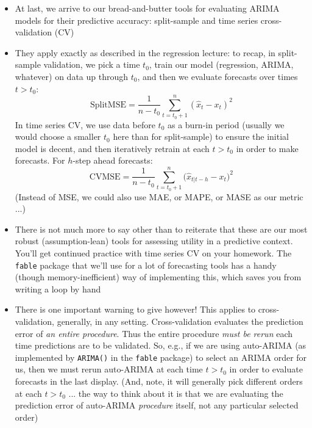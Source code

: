 \documentclass{article}
\begin{document}
\def\SplitMSE{\mathrm{SplitMSE}} 
\def\CVMSE{\mathrm{CVMSE}}

\begin{itemize}
\item At last, we arrive to our bread-and-butter tools for evaluating ARIMA  
  models for their predictive accuracy: split-sample and time series
  cross-validation (CV) 

\item They apply exactly as described in the regression lecture: to recap, in
  split-sample validation, we pick a time $t_0$, train our model (regression,
  ARIMA, whatever) on data up through $t_0$, and then we evaluate forecasts  
   over times $t > t_0$:
  \[
  \SplitMSE = \frac{1}{n-t_0} \sum_{t = t_0+1}^n (\hat{x}_t - x_t)^2    
  \]
  In time series CV, we use data before $t_0$ as a burn-in period (usually we
  would choose a smaller $t_0$ here than for split-sample) to ensure the initial
  model is decent, and then iteratively retrain at each $t > t_0$ in order to
  make forecasts. For $h$-step ahead forecasts:    
  \[
  \CVMSE = \frac{1}{n-t_0} \sum_{t = t_0+1}^n \big( \hat{x}_{t | t-h} - x_t
  \big)^2    
  \]
  (Instead of MSE, we could also use MAE, or MAPE, or MASE as our metric ...) 

\item There is not much more to say other than to reiterate that these are our
  most robust (assumption-lean) tools for assessing utility in a predictive 
  context. You'll get continued practice with time series CV on your
  homework. The \verb|fable| package that we'll use for a lot of forecasting
  tools has a handy (though memory-inefficient) way of implementing this, which
  saves you from writing a loop by hand 

\item There is one important warning to give however! This applies to
  cross-validation, generally, in any setting. Cross-validation evaluates the
  prediction error of \emph{an entire procedure}. Thus the entire procedure
  \emph{must be rerun} each time predictions are to be validated. So, e.g., if
  we are using auto-ARIMA (as implemented by \verb|ARIMA()| in the \verb|fable|
  package) to select an ARIMA order for us, then we must rerun auto-ARIMA at
  each time $t > t_0$ in order to evaluate forecasts in the last display. (And,
  note, it will generally pick different orders at each $t > t_0$ ... the way to
  think about it is that we are evaluating the prediction error of auto-ARIMA 
  \emph{procedure} itself, not any particular selected order) 


\end{itemize}
\end{document}
